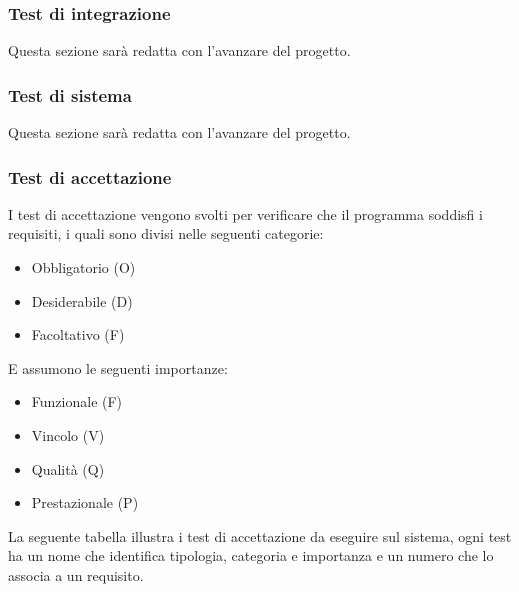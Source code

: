\subsubsection{Test di integrazione}
Questa sezione sarà redatta con l'avanzare del progetto.
\subsubsection{Test di sistema}
Questa sezione sarà redatta con l'avanzare del progetto.
\subsubsection{Test di accettazione}
I test di accettazione vengono svolti per verificare che il programma soddisfi i requisiti, i quali sono divisi nelle seguenti categorie:
\begin{itemize}
    \item Obbligatorio (O)
    \item Desiderabile (D)
    \item Facoltativo (F)
\end{itemize}
E assumono le seguenti importanze:
\begin{itemize}
    \item Funzionale (F)
    \item Vincolo (V)
    \item Qualit\`a (Q)
    \item Prestazionale (P)
\end{itemize}
\newpage
La seguente tabella illustra i test di accettazione da eseguire sul sistema, ogni test ha un nome che identifica tipologia, categoria e importanza e un numero che lo associa a un requisito.

